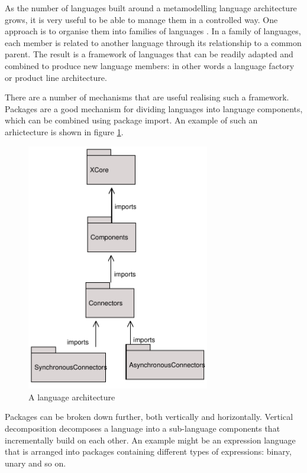 As the number of languages built around a metamodelling language
architecture grows, it is very useful to be able to manage them in
a controlled way. One approach is to organise them into families
of languages \cite{prefaces}. In a family of languages, each
member is related to another language through its relationship to
a common parent. The result is a framework of languages that can
be readily adapted and combined to produce new language members:
in other words a language factory or product line architecture.

There are a number of mechanisms that are useful realising such a
framework. Packages are a good mechanism for dividing languages
into language components, which can be combined using package
import. An example of such an arhictecture is shown in figure
\ref{langarch}.

\begin{figure}[htb]
\begin{center}
\includegraphics[width=8cm]{LanguageFamilies/figures/langarch}
\caption{A language architecture} \label{langarch}
\end{center}
\end{figure}

Packages can be broken down further, both vertically and
horizontally. Vertical decomposition decomposes a language into a
sub-language components that incrementally build on each other. An
example might be an expression language that is arranged into
packages containing different types of expressions: binary, unary
and so on.

